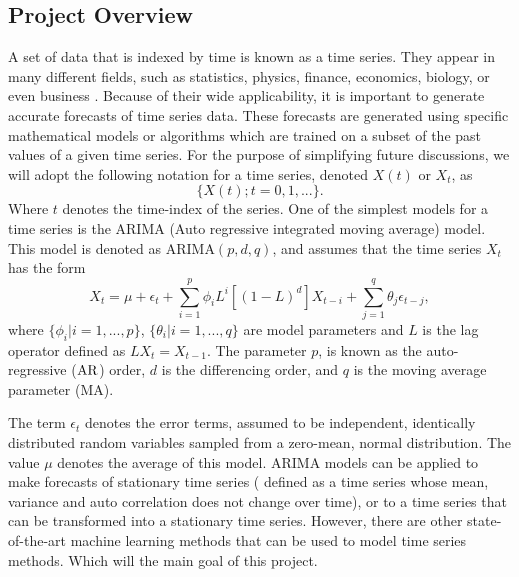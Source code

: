 \documentclass[10pt,a4paper]{article}
\begin{document}
\subsection{Project Overview}\label{sec: overview}
%
A set of data that is indexed by time is known as a time series. They appear in many different fields, such as statistics, physics, finance, economics, biology, or even business \cite{Adhikari_2013}. Because of their wide applicability, it is important to generate accurate forecasts of time series data. These forecasts are generated using specific mathematical models or algorithms which are trained on a subset of the past values of a given time series. For the purpose of simplifying future discussions, we will adopt the following notation for a time series, denoted $X(t)$ or $X_t$, as
\begin{equation}
\lbrace X(t); t=0,1,... \rbrace.
\end{equation}
Where $t$ denotes the time-index of the series. One of the simplest models for a time series is the ARIMA (Auto regressive integrated moving average) model. This model is denoted as ARIMA$(p,d,q)$, and assumes that the time series $X_t$ has the form
\begin{equation}
X_{t} = \mu +\epsilon_t+ \sum_{i=1}^p \phi_i L^i \left[ (1-L)^d \right] X_{t-i} + \sum_{j=1}^q \theta_j \epsilon_{t-j},
\end{equation}  
where $\lbrace \phi_i | i=1,...,p \rbrace$, $\lbrace \theta_i | i=1,...,q \rbrace$ are model parameters and $L$ is the lag operator defined as $L X_t = X_{t-1} $. The parameter $p$, is known as the auto-regressive (${\rm AR}$) order, $d$ is the differencing order, and $q$ is the moving average parameter (MA). 

The term $\epsilon_{t}$ denotes the error terms, assumed to be independent, identically distributed random variables sampled from a zero-mean, normal distribution. The value $\mu$ denotes the average of this model. ARIMA models can be applied to make forecasts of stationary time series ( defined as a time series whose mean, variance and auto correlation does not change over time), or to a time series that can be transformed into a stationary time series. However, there are other state-of-the-art machine learning methods that can be used to model time series methods. Which will the main goal of this project.
\end{document}
